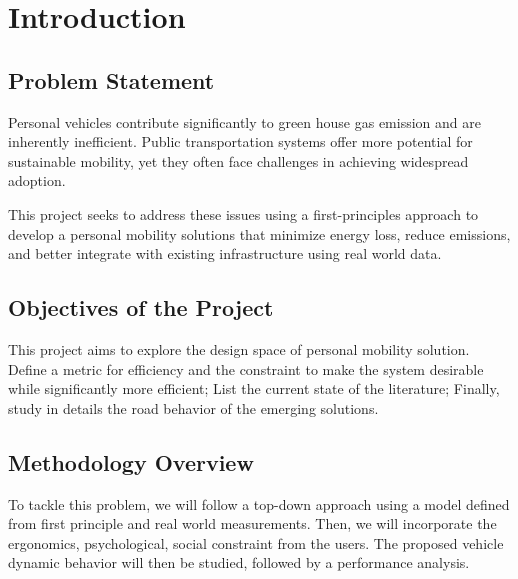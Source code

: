 \section{Introduction}

\subsection{Problem Statement}

Personal vehicles contribute significantly to green house gas emission and are inherently inefficient.\cite{us_epa_carbon_2015} Public transportation systems offer more potential for sustainable mobility, yet they often face challenges in achieving widespread adoption.

 This project seeks to address these issues using a first-principles approach to develop a personal mobility solutions that minimize energy loss, reduce emissions, and better integrate with existing infrastructure using real world data.

\subsection{Objectives of the Project}

This project aims to explore the design space of personal mobility solution. Define a metric for efficiency and the constraint to make the system desirable while significantly more efficient; List the current state of the literature; Finally, study in details the road behavior of the emerging solutions.

\subsection{Methodology Overview}

To tackle this problem, we will follow a  top-down approach using a model defined from first principle and real world measurements. Then, we will incorporate the ergonomics, psychological, social constraint from the users.
The proposed vehicle dynamic behavior will then be studied, followed by a performance analysis.